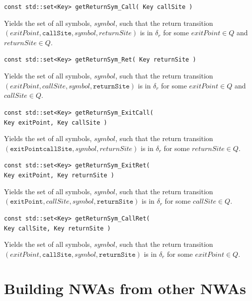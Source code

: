 \documentclass{llncs}
\begin{document}
\begin{description}
  \item\texttt{const std::set<Key> getReturnSym\_Call( Key callSite )} \nopagebreak

    Yields the set of all symbols, $symbol$, such that the return transition $(exitPoint,\texttt{callSite},symbol,returnSite)$ is in $\delta_r$ for some $exitPoint \in Q$ and $returnSite \in Q$.

  \item\texttt{const std::set<Key> getReturnSym\_Ret( Key returnSite )} \nopagebreak

    Yields the set of all symbols, $symbol$, such that the return transition $(exitPoint,callSite,symbol,\texttt{returnSite})$ is in $\delta_r$ for some $exitPoint \in Q$ and $callSite \in Q$.

  \item\texttt{const std::set<Key> getReturnSym\_ExitCall( \\ \hspace*{3.25cm} Key exitPoint, Key callSite )} \nopagebreak

    Yields the set of all symbols, $symbol$, such that the return transition $(\texttt{exitPoint}\texttt{callSite},symbol,returnSite)$ is in $\delta_r$ for some $returnSite \in Q$.

  \item\texttt{const std::set<Key> getReturnSym\_ExitRet( \\ \hspace*{3.25cm} Key exitPoint, Key returnSite )} \nopagebreak

    Yields the set of all symbols, $symbol$, such that the return transition $(\texttt{exitPoint},callSite,symbol,\texttt{returnSite})$ is in $\delta_r$ for some $callSite \in Q$.

  \item\texttt{const std::set<Key> getReturnSym\_CallRet( \\ \hspace*{3.25cm} Key callSite, Key returnSite )} \nopagebreak

    Yields the set of all symbols, $symbol$, such that the return transition $(exitPoint,\texttt{callSite},symbol,\texttt{returnSite})$ is in $\delta_r$ for some $exitPoint \in Q$. \\

\end{description}

\section{Building NWAs from other NWAs}
\label{Se:Building NWAs}
\end{document}
